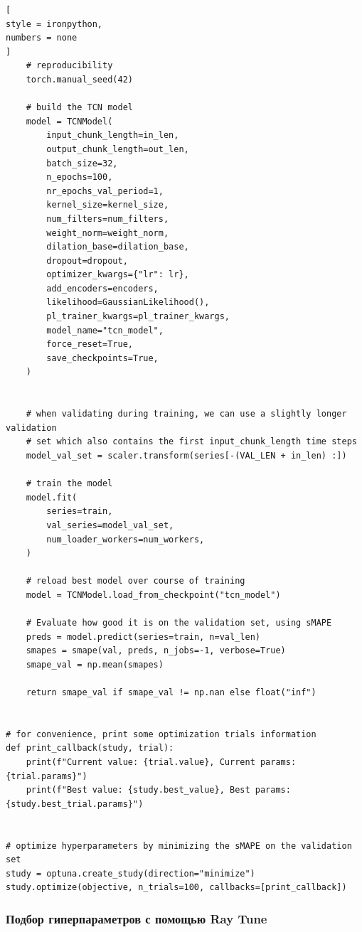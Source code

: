 \documentclass[%
	11pt,
	a4paper,
	utf8,
		]{article}
\begin{document}
\begin{lstlisting}[
style = ironpython,
numbers = none
]
	# reproducibility
	torch.manual_seed(42)
	
	# build the TCN model
	model = TCNModel(
		input_chunk_length=in_len,
		output_chunk_length=out_len,
		batch_size=32,
		n_epochs=100,
		nr_epochs_val_period=1,
		kernel_size=kernel_size,
		num_filters=num_filters,
		weight_norm=weight_norm,
		dilation_base=dilation_base,
		dropout=dropout,
		optimizer_kwargs={"lr": lr},
		add_encoders=encoders,
		likelihood=GaussianLikelihood(),
		pl_trainer_kwargs=pl_trainer_kwargs,
		model_name="tcn_model",
		force_reset=True,
		save_checkpoints=True,
	)
	
	
	# when validating during training, we can use a slightly longer validation
	# set which also contains the first input_chunk_length time steps
	model_val_set = scaler.transform(series[-(VAL_LEN + in_len) :])
	
	# train the model
	model.fit(
		series=train,
		val_series=model_val_set,
		num_loader_workers=num_workers,
	)
	
	# reload best model over course of training
	model = TCNModel.load_from_checkpoint("tcn_model")
	
	# Evaluate how good it is on the validation set, using sMAPE
	preds = model.predict(series=train, n=val_len)
	smapes = smape(val, preds, n_jobs=-1, verbose=True)
	smape_val = np.mean(smapes)
	
	return smape_val if smape_val != np.nan else float("inf")


# for convenience, print some optimization trials information
def print_callback(study, trial):
	print(f"Current value: {trial.value}, Current params: {trial.params}")
	print(f"Best value: {study.best_value}, Best params: {study.best_trial.params}")


# optimize hyperparameters by minimizing the sMAPE on the validation set
study = optuna.create_study(direction="minimize")
study.optimize(objective, n_trials=100, callbacks=[print_callback])
\end{lstlisting}

\subsubsection{Подбор гиперпараметров с помощью Ray Tune}
\end{document}
